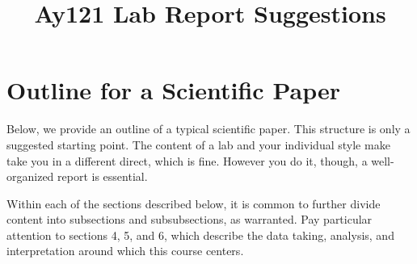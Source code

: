 \documentclass[12pt,preprint]{aastex}
\begin{document}
\title{Ay121 Lab Report Suggestions}

\tableofcontents

\section{Outline for a Scientific Paper}

\noindent
Below, we provide an outline of a typical scientific paper. This structure is only a suggested starting point. The content of a lab and your individual style make take you in
a different direct, which is fine. However you do it, though, a well-organized report is essential.

Within each of the sections described below, it is common to further divide content into subsections and
subsubsections, as warranted.  
Pay particular attention to sections 
 4, 5, and 6, which describe the data taking, 
analysis, and interpretation around which this course centers. 
\end{document}

